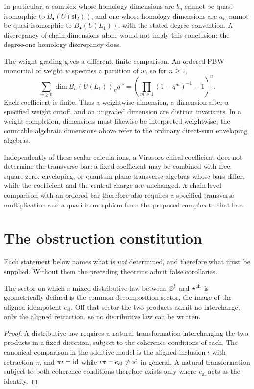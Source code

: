 In particular, a complex whose homology dimensions are $b_n$ cannot be
quasi-isomorphic to $B_\bullet(U(\mathfrak{sl}_2))$, and one whose homology
dimensions are $a_n$ cannot be quasi-isomorphic to $B_\bullet(U(L_1))$,
with the stated degree convention.  A discrepancy of chain dimensions
alone would not imply this conclusion; the degree-one homology discrepancy
does.

The weight grading gives a different, finite comparison.  An ordered PBW
monomial of weight $w$ specifies a partition of $w$, so for $n\ge1$,
\[
 \sum_{w\ge0}\dim B_n(U(L_1))_w q^w
 =\left(\prod_{m\ge1}(1-q^m)^{-1}-1\right)^n.
\]
Each coefficient is finite.  Thus a weightwise dimension, a dimension
after a specified weight cutoff, and an ungraded dimension are distinct
invariants.  In a weight completion, dimensions must likewise be interpreted
weightwise; the countable algebraic dimensions above refer to the ordinary
direct-sum enveloping algebras.

\begin{remark}
Independently of these scalar calculations, a Virasoro chiral coefficient does not determine the transverse bar: a fixed coefficient may be combined with free, square-zero, enveloping, or quantum-plane transverse algebras whose bars differ, while the coefficient and the central charge are unchanged. A chain-level comparison with an ordered bar therefore also requires a specified transverse multiplication and a quasi-isomorphism from the proposed complex to that bar.
\end{remark}

\chapter{The obstruction constitution}
\label{ch:obstructions}

Each statement below names what is \emph{not} determined, and therefore what
must be supplied. Without them the preceding theorems admit false corollaries.

\begin{proposition}
\label{prop:lambda-sector-spine}
The sector on which a mixed distributive law between $\otimes^!$ and $\mathbin{\star^{\mathrm{ch}}}$
is geometrically defined is the common-decomposition sector, the image of the
aligned idempotent $e_{\mathrm{al}}$. Off that sector the two products admit no
interchange, only the aligned retraction, so no distributive law can be
written.
\end{proposition}
\begin{proof}
A distributive law requires a natural transformation interchanging the two
products in a fixed direction, subject to the coherence conditions of each. The
canonical comparison in the additive model is the aligned inclusion $\iota$ with
retraction $\pi$, and $\pi\iota=\operatorname{id}$ while $\iota\pi=e_{\mathrm{al}}\ne\operatorname{id}$ in
general. A natural transformation subject to both coherence conditions
therefore exists only where $e_{\mathrm{al}}$ acts as the identity.
\end{proof}

